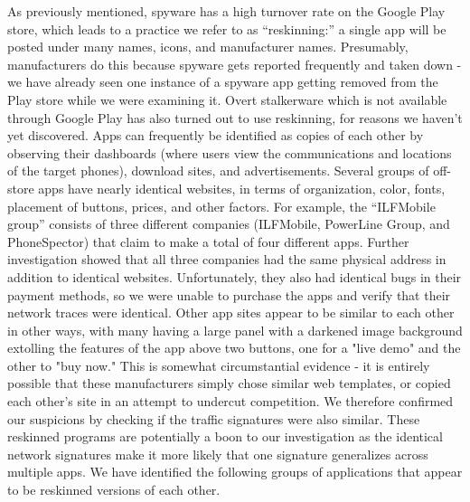 \documentclass[acmtog]{acmart}
\begin{document}
As previously mentioned, spyware has a high turnover rate on the Google Play 
store, which leads to a practice we refer to as “reskinning:” a single app will 
be posted under many names, icons, and manufacturer names. Presumably, 
manufacturers do this because spyware gets reported frequently and taken down - 
we have already seen one instance of a spyware app getting removed from the 
Play store while we were examining it. Overt stalkerware which is not available 
through Google Play has also turned out to use reskinning, for reasons we 
haven’t yet discovered. Apps can frequently be identified as copies of each 
other by observing their dashboards (where users view the communications and 
locations of the target phones), download sites, and advertisements. Several 
groups of off-store apps have nearly identical websites, in terms of 
organization, color, fonts, placement of buttons, prices, and other factors. 
For example, the “ILFMobile group” consists of three different companies 
(ILFMobile, PowerLine Group, and PhoneSpector) that claim to make a total of 
four different apps. Further investigation showed that all three companies had 
the same physical address in addition to identical websites. Unfortunately, 
they also had identical bugs in their payment methods, so we were unable to 
purchase the apps and verify that their network traces were identical. Other 
app sites appear to be similar to each other in other ways, 
with many having a large panel with a darkened image background extolling the 
features of the app above two buttons, one for a "live demo" and the other to 
"buy now." This is somewhat circumstantial evidence - it is entirely possible 
that these manufacturers simply chose similar web templates, or copied each 
other's site in an attempt to undercut competition. We therefore confirmed our 
suspicions by checking if the traffic signatures were also similar. These 
reskinned programs are potentially a boon to 
our investigation as the identical network signatures make it more likely that 
one signature generalizes across multiple apps. We have identified the 
following groups of applications that appear to be reskinned versions of each 
other.
\end{document}

